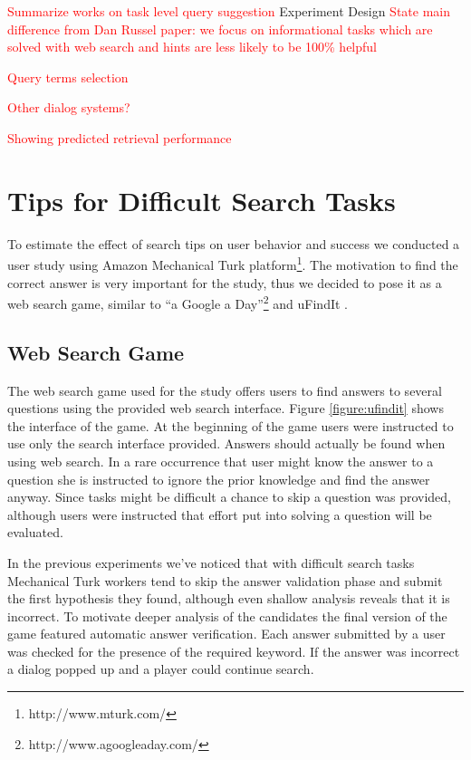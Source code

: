 \documentclass{sig-alternate}
\newcommand\todo[1]{\textcolor{red}{#1}}
\begin{document}
\todo{Summarize works on task level query suggestion}
Experiment Design
\todo{State main difference from Dan Russel paper: we focus on informational tasks which are solved with web search and hints are less likely to be 100\% helpful}

\todo{Query terms selection}

\todo{Other dialog systems?}

\todo{Showing predicted retrieval performance}

\section{Tips for Difficult Search Tasks}
To estimate the effect of search tips on user behavior and success we conducted a user study using Amazon Mechanical Turk platform\footnote{http://www.mturk.com/}. 
The motivation to find the correct answer is very important for the study, thus we decided to pose it as a web search game, similar to ``a Google a Day''\footnote{http://www.agoogleaday.com/} and uFindIt \cite{Ageev:2011:FYG:2009916.2009965}. 

\subsection{Web Search Game}
The web search game used for the study offers users to find answers to several questions using the provided web search interface. Figure \ref{figure:ufindit} shows the interface of the game.
At the beginning of the game users were instructed to use only the search interface provided.
Answers should actually be found when using web search.
In a rare occurrence that user might know the answer to a question she is instructed to ignore the prior knowledge and find the answer anyway.
Since tasks might be difficult a chance to skip a question was provided, although users were instructed that effort put into solving a question will be evaluated.

In the previous experiments we've noticed that with difficult search tasks Mechanical Turk workers tend to skip the answer validation phase and submit the first hypothesis they found, although even shallow analysis reveals that it is incorrect.
To motivate deeper analysis of the candidates the final version of the game featured automatic answer verification. Each answer submitted by a user was checked for the presence of the required keyword.
If the answer was incorrect a dialog popped up and a player could continue search.
\end{document}
